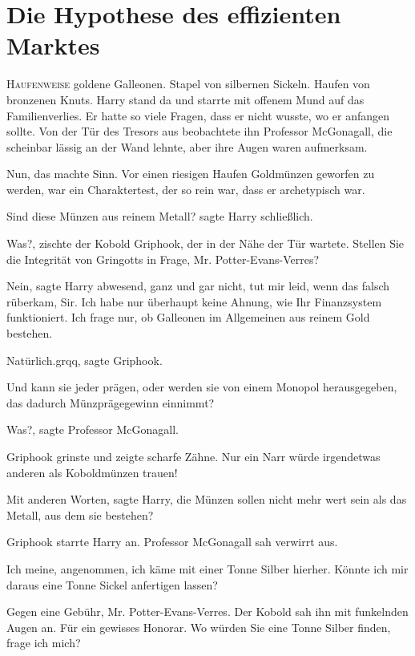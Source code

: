 \chapter{Die Hypothese des effizienten Marktes}

\lettrine{H}{aufenweise} goldene Galleonen. Stapel von silbernen Sickeln. Haufen
von bronzenen Knuts. Harry stand da und starrte mit offenem Mund auf das
Familienverlies. Er hatte so viele Fragen, dass er nicht wusste, wo er anfangen
sollte. Von der Tür des Tresors aus beobachtete ihn Professor McGonagall, die
scheinbar lässig an der Wand lehnte, aber ihre Augen waren aufmerksam.

Nun, das machte Sinn. Vor einen riesigen Haufen Goldmünzen geworfen zu werden,
war ein Charaktertest, der so rein war, dass er archetypisch war.

\glqq{}Sind diese Münzen aus reinem Metall?\grqq{} sagte Harry schließlich.

\glqq{}Was?\grqq{}, zischte der Kobold Griphook, der in der Nähe der Tür wartete.
\glqq{}Stellen Sie die Integrität von Gringotts in Frage, Mr.
Potter-Evans-Verres?\grqq{}

\glqq{}Nein\grqq{}, sagte Harry abwesend, \glqq{}ganz und gar nicht, tut mir leid,
wenn das falsch rüberkam, Sir. Ich habe nur überhaupt keine Ahnung, wie Ihr
Finanzsystem funktioniert. Ich frage nur, ob Galleonen im Allgemeinen aus reinem
Gold bestehen.\grqq{}

\glqq{}Natürlich\grqq{}.grqq{}, sagte Griphook.

\glqq{}Und kann sie jeder prägen, oder werden sie von einem Monopol
herausgegeben, das dadurch Münzprägegewinn einnimmt?\grqq{}

\glqq{}Was?\grqq{}, sagte Professor McGonagall.

Griphook grinste und zeigte scharfe Zähne. \glqq{}Nur ein Narr würde irgendetwas
anderen als Koboldmünzen trauen!\grqq{}

\glqq{}Mit anderen Worten\grqq{}, sagte Harry, \glqq{}die Münzen sollen nicht mehr
wert sein als das Metall, aus dem sie bestehen?\grqq{}

Griphook starrte Harry an. Professor McGonagall sah verwirrt aus.

\glqq{}Ich meine, angenommen, ich käme mit einer Tonne Silber hierher. Könnte ich
mir daraus eine Tonne Sickel anfertigen lassen?\grqq{}

\glqq{}Gegen eine Gebühr, Mr. Potter-Evans-Verres.\grqq{} Der Kobold sah ihn mit
funkelnden Augen an. \glqq{}Für ein gewisses Honorar. Wo würden Sie eine Tonne
Silber finden, frage ich mich?\grqq{}

